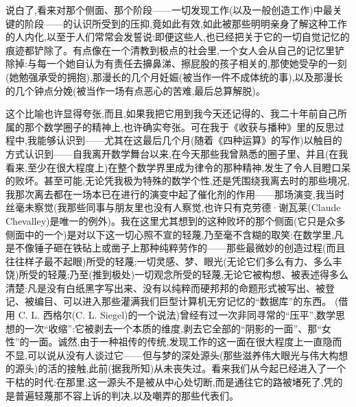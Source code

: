说白了,看来对那个侧面、那个阶段——一切发现工作(以及一般创造工作)中最关键的阶段——的认识所受到的压抑,竟如此有效,如此被那些明明亲身了解这种工作的人内化,以至于人们常常会发誓说:即便这些人,也已经把关于它的一切自觉记忆的痕迹都铲除了。有点像在一个清教到极点的社会里,一个女人会从自己的记忆里铲除掉:与每一个她自认为有责任去擤鼻涕、擦屁股的孩子相关的,那使她受孕的一刻(她勉强承受的拥抱),那漫长的几个月妊娠(被当作一件不成体统的事),以及那漫长的几个钟点分娩(被当作一场有点恶心的苦难,最后总算解脱)。

这个比喻也许显得夸张,而且,如果我把它用到我今天还记得的、我二十年前自己所属的那个数学圈子的精神上,也许确实夸张。可在我于《收获与播种》里的反思过程中,我能够认识到——尤其在这最后几个月(随着《四种运算》的写作)以触目的方式认识到——自我离开数学舞台以来,在今天那些我曾熟悉的圈子里、并且(在我看来,至少在很大程度上)在整个数学界里成为律令的那种精神,发生了令人目瞪口呆的败坏。甚至可能,无论凭我极为特殊的数学个性,还是凭围绕我离去时的那些境况,我那次离去都在一场本已在进行的演变中起了催化剂的作用——那场演变,我当时丝毫未察觉(我那些同事与朋友里也没有人察觉,也许只有克劳德·谢瓦莱(Claude Chevalley)是唯一的例外)。我在这里尤其想到的这种败坏的那个侧面(它只是众多侧面中的一个)是对以下这一切心照不宣的轻蔑,乃至毫不含糊的取笑:在数学里,凡是不像锤子砸在铁砧上或凿子上那种纯粹劳作的——那些最微妙的创造过程(而且往往样子最不起眼)所受的轻蔑;一切灵感、梦、眼光(无论它们多么有力、多么丰饶)所受的轻蔑;乃至(推到极处)一切观念所受的轻蔑,无论它被构想、被表述得多么清楚:凡是没有白纸黑字写出来、没有以纯粹而硬邦邦的命题形式被写出、被登记、被编目、可以进入那些灌满我们巨型计算机无穷记忆的“数据库”的东西。
(借用 C. L. 西格尔(C. L. Siegel)的一个说法)曾经有过一次非同寻常的“压平”,数学思想的一次“收缩”:它被剥去一个本质的维度,剥去它全部的“阴影的一面”、那“女性”的一面。诚然,由于一种祖传的传统,发现工作的这一面在很大程度上一直隐而不显,可以说从没有人谈过它——但与梦的深处源头(那些滋养伟大眼光与伟大构想的源头)的活的接触,此前(据我所知)从未丧失过。看来我们从今起已经进入了一个干枯的时代:在那里,这一源头不是被从中心处切断,而是通往它的路被堵死了,凭的是普遍轻蔑那不容上诉的判决,以及嘲弄的那些代表们。

